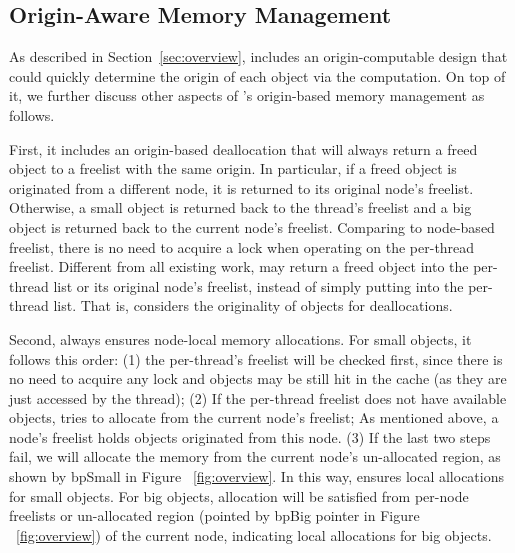\subsection{Origin-Aware Memory Management} 
\label{sec:origin}


As described in Section~\ref{sec:overview}, \NM{} includes an origin-computable design that could quickly determine the origin of each object via the computation. On top of it, we further discuss other aspects of \NM{}'s origin-based memory management as follows.  

First, it includes an origin-based deallocation that will always return a freed object to a freelist with the same origin. In particular, if a freed object is originated from a different node, it is returned to its original node's  freelist. Otherwise, a small object is returned back to the thread's freelist and a big object is returned back to the current node's freelist. Comparing to node-based freelist, there is no need to acquire a lock when operating on the per-thread freelist. Different from all existing work, \NM{} may return a freed object into the per-thread list or its original node's freelist, instead of simply putting into the per-thread list. That is, \NM{} considers the originality of objects for deallocations.   

Second, \NM{} always ensures node-local memory allocations. For small objects, it follows this order: (1) the per-thread's freelist will be checked first, since there is no need to acquire any lock and objects may be still hit in the cache (as they are just accessed by the thread); (2) If the per-thread freelist does not have available objects, \NM{} tries to allocate from the current node's freelist; As mentioned above, a node's freelist holds objects originated from this node. (3) If the last two steps fail,  we will allocate the memory from the current node's un-allocated region, as shown by bpSmall in Figure ~\ref{fig:overview}. In this way, 
\NM{} ensures local allocations for small objects. For big objects, allocation will be satisfied from per-node freelists or un-allocated region (pointed by bpBig pointer in Figure ~\ref{fig:overview}) of the current node, indicating local allocations for big objects. 


